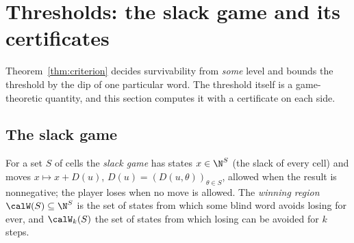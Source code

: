 \section{Thresholds: the slack game and its certificates}\label{sec:thresholds}

Theorem~\ref{thm:criterion} decides survivability from \emph{some} level and bounds the threshold by the dip of one particular word. The threshold itself is a game-theoretic quantity, and this section computes it with a certificate on each side.

\subsection{The slack game}
\begin{definition}\label{def:game}
For a set $S$ of cells the \emph{slack game} has states $x\in\N^S$ (the slack of every cell) and moves $x\mapsto x+D(u)$, $D(u)=(D(u,\theta))_{\theta\in S}$, allowed when the result is nonnegative; the player loses when no move is allowed. The \emph{winning region} $\calW(S)\subseteq\N^S$ is the set of states from which some blind word avoids losing for ever, and $\calW_k(S)$ the set of states from which losing can be avoided for $k$ steps.
\end{definition}

